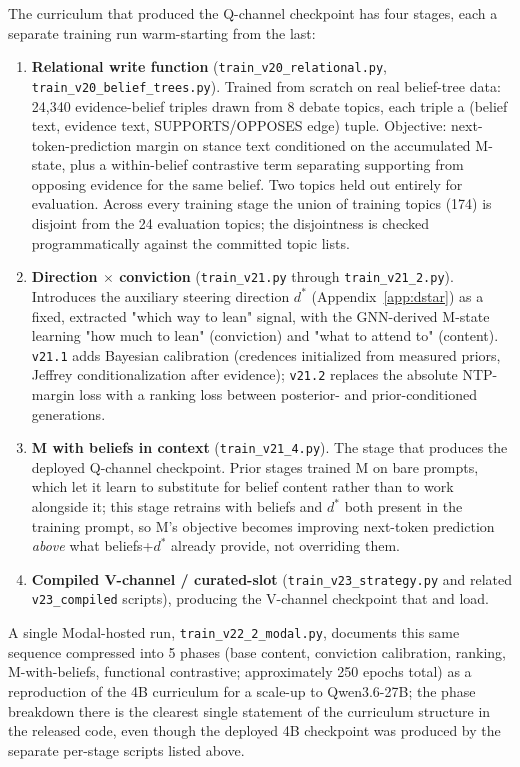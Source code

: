 The curriculum that produced the Q-channel checkpoint has four stages, each a separate
training run warm-starting from the last:

\begin{enumerate}
\item \textbf{Relational write function} (\texttt{train\_v20\_relational.py},
\texttt{train\_v20\_belief\_trees.py}). Trained from scratch on real belief-tree data:
24,340 evidence-belief triples drawn from 8 debate topics, each triple a
(belief text, evidence text, SUPPORTS/OPPOSES edge) tuple. Objective: next-token-prediction
margin on stance text conditioned on the accumulated M-state, plus a within-belief
contrastive term separating supporting from opposing evidence for the same belief. Two
topics held out entirely for evaluation. Across every training stage the union of training
topics (174) is disjoint from the 24 evaluation topics; the disjointness is checked
programmatically against the committed topic lists.
\item \textbf{Direction $\times$ conviction} (\texttt{train\_v21.py} through
\texttt{train\_v21\_2.py}). Introduces the auxiliary steering direction $d^*$
(Appendix~\ref{app:dstar}) as a fixed, extracted "which way to lean" signal, with the
GNN-derived M-state learning "how much to lean" (conviction) and "what to attend to"
(content). \texttt{v21.1} adds Bayesian calibration (credences initialized from measured
priors, Jeffrey conditionalization after evidence); \texttt{v21.2} replaces the absolute
NTP-margin loss with a ranking loss between posterior- and prior-conditioned generations.
\item \textbf{M with beliefs in context} (\texttt{train\_v21\_4.py}). The stage that
produces the deployed Q-channel checkpoint. Prior stages trained M on bare prompts, which
let it learn to substitute for belief content rather than to work alongside it; this
stage retrains with beliefs and $d^*$ both present in the training prompt, so M's
objective becomes improving next-token prediction \emph{above} what beliefs+$d^*$ already
provide, not overriding them.
\item \textbf{Compiled V-channel / curated-slot} (\texttt{train\_v23\_strategy.py} and
related \texttt{v23\_compiled} scripts), producing the V-channel checkpoint that
\condF{} and \condC{} load.
\end{enumerate}

A single Modal-hosted run, \texttt{train\_v22\_2\_modal.py}, documents this same sequence
compressed into 5 phases (base content, conviction calibration, ranking, M-with-beliefs,
functional contrastive; approximately 250 epochs total) as a reproduction of the 4B
curriculum for a scale-up to Qwen3.6-27B; the phase breakdown there is the clearest single
statement of the curriculum structure in the released code, even though the deployed 4B
checkpoint was produced by the separate per-stage scripts listed above.

